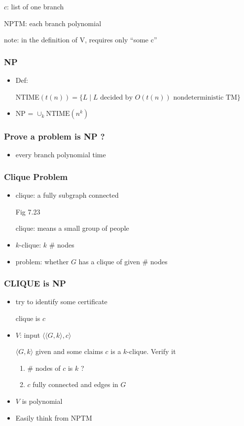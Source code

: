 \begin{frame}[allowframebreaks]
\begin{itemize}
$c$: list of one branch

NPTM: each branch polynomial

note: in the definition of V, requires only ``some c''


\end{itemize}\end{frame} \begin{frame}[allowframebreaks] \frametitle{NP}
  \begin{itemize}
\item Def:

NTIME$(t(n)) = \{L\mid L
\text{ decided by } O(t(n))
\text{ nondeterministic TM}\}$
\item NP = $\cup_k \text{NTIME}(n^k)$

\end{itemize}\end{frame} \begin{frame}[allowframebreaks] \frametitle{Prove a problem is NP ?}
  \begin{itemize}
\item every branch polynomial time
\end{itemize}\end{frame} \begin{frame}[allowframebreaks] \frametitle{Clique Problem}
  \begin{itemize}
\item clique: a fully subgraph connected

Fig 7.23

clique: means a small group of people

\item $k$-clique: $k$ \# nodes
\item problem: whether $G$ has a clique of given \# nodes
\end{itemize}\end{frame} \begin{frame}[allowframebreaks] \frametitle{CLIQUE is NP}
  \begin{itemize}
\item try to identify some certificate

clique is $c$
\item $V$: input $\langle  \langle  G,k\rangle ,c\rangle $

$\langle  G,k\rangle $ given and some claims $c$ is a $k$-clique. Verify it
  \begin{enumerate}
  \item \# nodes of $c$ is $k$ ?
  \item $c$ fully connected and edges in $G$
  \end{enumerate}
  \item $V$ is polynomial
  \item Easily think from NPTM


\end{itemize}
\end{frame}
